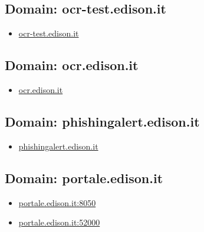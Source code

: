 \documentclass{article}
\begin{document}
    \subsection{Domain: ocr-test.edison.it}
    \begin{itemize}
        
            
                
                \item \href{ http://ocr-test.edison.it/}{ ocr-test.edison.it }
            
        
    \end{itemize}

    \subsection{Domain: ocr.edison.it}
    \begin{itemize}
        
            
                
                \item \href{ http://ocr.edison.it/}{ ocr.edison.it }
            
        
    \end{itemize}

    \subsection{Domain: phishingalert.edison.it}
    \begin{itemize}
        
            
                
                \item \href{ https://phishingalert.edison.it/}{ phishingalert.edison.it }
            
        
    \end{itemize}

    \subsection{Domain: portale.edison.it}
    \begin{itemize}
        
            
                
                \item \href{ https://portale.edison.it:8050/sap(bD1pdCZjPTIyMCZkPW1pbg==)/bc/bsp/sap/zpqf\_bsp\_app/initial\_it.htm}{ portale.edison.it:8050 }
            
                
                \item \href{ https://portale.edison.it:52000/irj/portal}{ portale.edison.it:52000 }
            
        
    \end{itemize}
\end{document}
